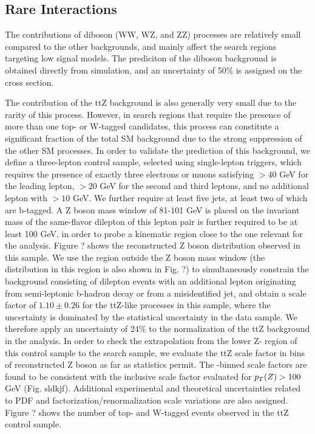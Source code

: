 \subsection{Rare Interactions}
\label{subsec:rare}

The contributions of diboson (WW, WZ, and ZZ) processes are relatively small compared to the other backgrounds, and mainly affect the search regions targeting low \dm{} signal models. The prediciton of the diboson background is obtained directly from simulation, and an uncertainty of 50\% is assigned on the cross section.

The contribution of the ttZ background is also generally very small due to the rarity of this process. However, in search regions that require the presence of more than one top- or W-tagged candidates, this process can constitute a significant fraction of the total SM background due to the strong suppression of the other SM processes. In order to validate the prediction of this background, we define a three-lepton control sample, selected using single-lepton triggers, which requires the presence of exactly three electrons or muons satisfying \pt$>40$ GeV for the leading lepton, \pt$>20$ GeV for the second and third leptons, and no additional lepton with \pt$>10$ GeV. We further require at least five jets, at least two of which are b-tagged. A Z boson mass window of 81-101 GeV is placed on the invariant mass of the same-flavor dilepton \pt{} of this lepton pair is further required to be at least 100 GeV, in order to probe a kinematic region close to the one relevant for the analysis. Figure ? shows the reconstructed Z boson \pt{} distribution observed in this sample. We use the region outside the Z boson mass window (the \met{} distribution in this region is also shown in Fig. ?) to simultaneously constrain the \ttbar background consisting of dilepton \ttbar events with an additional lepton originating from semi-leptonic b-hadron decay or from a misidentified jet, and obtain a scale factor of $1.10\pm0.26$ for the ttZ-like processes in this sample, where the uncertainty is dominated by the statistical uncertainty in the data sample. We therefore apply an uncertainty of 24\% to the normalization of the ttZ background in the analysis. In order to check the extrapolation from the lower Z-\pt{} region of this control sample to the search sample, we evaluate the ttZ scale factor in bins of reconstructed Z boson \pt{} as far as statistics permit. The \pt-binned scale factors are found to be consistent with the inclusive scale factor evaluated for $p_{T}(Z)>100$ GeV (Fig. sldkjf). Additional experimental and theoretical uncertainties related to PDF and factorization/renormalization scale variations are also assigned. Figure ? shows the number of top- and W-tagged events observed in the ttZ control sample. 

